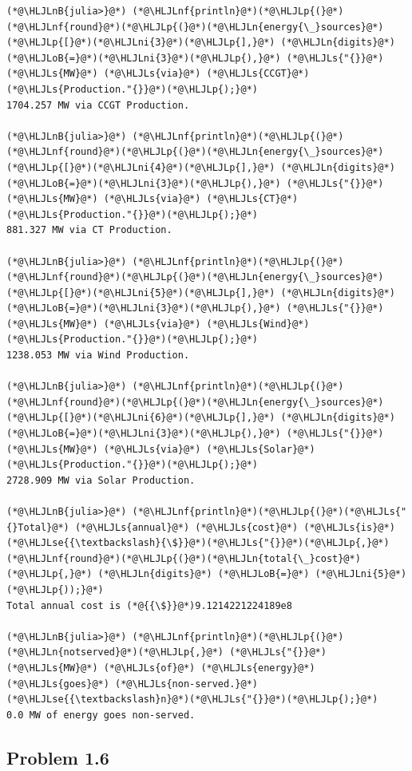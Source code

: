 \documentclass[12pt,a4paper]{article}
\newcommand{\HLJLn}[1]{#1}
\newcommand{\HLJLnf}[1]{\textcolor[RGB]{66,102,213}{#1}}
\newcommand{\HLJLs}[1]{\textcolor[RGB]{201,61,57}{#1}}
\newcommand{\HLJLse}[1]{\textcolor[RGB]{59,151,46}{#1}}
\newcommand{\HLJLnB}[1]{\textcolor[RGB]{59,151,46}{#1}}
\newcommand{\HLJLni}[1]{\textcolor[RGB]{59,151,46}{#1}}
\newcommand{\HLJLoB}[1]{\textcolor[RGB]{102,102,102}{\textbf{#1}}}
\newcommand{\HLJLp}[1]{#1}
\begin{document}
\begin{lstlisting}
(*@\HLJLnB{julia>}@*) (*@\HLJLnf{println}@*)(*@\HLJLp{(}@*)(*@\HLJLnf{round}@*)(*@\HLJLp{(}@*)(*@\HLJLn{energy{\_}sources}@*)(*@\HLJLp{[}@*)(*@\HLJLni{3}@*)(*@\HLJLp{],}@*) (*@\HLJLn{digits}@*) (*@\HLJLoB{=}@*)(*@\HLJLni{3}@*)(*@\HLJLp{),}@*) (*@\HLJLs{"{}}@*) (*@\HLJLs{MW}@*) (*@\HLJLs{via}@*) (*@\HLJLs{CCGT}@*) (*@\HLJLs{Production."{}}@*)(*@\HLJLp{);}@*)
1704.257 MW via CCGT Production.

(*@\HLJLnB{julia>}@*) (*@\HLJLnf{println}@*)(*@\HLJLp{(}@*)(*@\HLJLnf{round}@*)(*@\HLJLp{(}@*)(*@\HLJLn{energy{\_}sources}@*)(*@\HLJLp{[}@*)(*@\HLJLni{4}@*)(*@\HLJLp{],}@*) (*@\HLJLn{digits}@*) (*@\HLJLoB{=}@*)(*@\HLJLni{3}@*)(*@\HLJLp{),}@*) (*@\HLJLs{"{}}@*) (*@\HLJLs{MW}@*) (*@\HLJLs{via}@*) (*@\HLJLs{CT}@*) (*@\HLJLs{Production."{}}@*)(*@\HLJLp{);}@*)
881.327 MW via CT Production.

(*@\HLJLnB{julia>}@*) (*@\HLJLnf{println}@*)(*@\HLJLp{(}@*)(*@\HLJLnf{round}@*)(*@\HLJLp{(}@*)(*@\HLJLn{energy{\_}sources}@*)(*@\HLJLp{[}@*)(*@\HLJLni{5}@*)(*@\HLJLp{],}@*) (*@\HLJLn{digits}@*) (*@\HLJLoB{=}@*)(*@\HLJLni{3}@*)(*@\HLJLp{),}@*) (*@\HLJLs{"{}}@*) (*@\HLJLs{MW}@*) (*@\HLJLs{via}@*) (*@\HLJLs{Wind}@*) (*@\HLJLs{Production."{}}@*)(*@\HLJLp{);}@*)
1238.053 MW via Wind Production.

(*@\HLJLnB{julia>}@*) (*@\HLJLnf{println}@*)(*@\HLJLp{(}@*)(*@\HLJLnf{round}@*)(*@\HLJLp{(}@*)(*@\HLJLn{energy{\_}sources}@*)(*@\HLJLp{[}@*)(*@\HLJLni{6}@*)(*@\HLJLp{],}@*) (*@\HLJLn{digits}@*) (*@\HLJLoB{=}@*)(*@\HLJLni{3}@*)(*@\HLJLp{),}@*) (*@\HLJLs{"{}}@*) (*@\HLJLs{MW}@*) (*@\HLJLs{via}@*) (*@\HLJLs{Solar}@*) (*@\HLJLs{Production."{}}@*)(*@\HLJLp{);}@*)
2728.909 MW via Solar Production.

(*@\HLJLnB{julia>}@*) (*@\HLJLnf{println}@*)(*@\HLJLp{(}@*)(*@\HLJLs{"{}Total}@*) (*@\HLJLs{annual}@*) (*@\HLJLs{cost}@*) (*@\HLJLs{is}@*) (*@\HLJLse{{\textbackslash}{\$}}@*)(*@\HLJLs{"{}}@*)(*@\HLJLp{,}@*) (*@\HLJLnf{round}@*)(*@\HLJLp{(}@*)(*@\HLJLn{total{\_}cost}@*)(*@\HLJLp{,}@*) (*@\HLJLn{digits}@*) (*@\HLJLoB{=}@*) (*@\HLJLni{5}@*)(*@\HLJLp{));}@*)
Total annual cost is (*@{{\$}}@*)9.1214221224189e8

(*@\HLJLnB{julia>}@*) (*@\HLJLnf{println}@*)(*@\HLJLp{(}@*)(*@\HLJLn{notserved}@*)(*@\HLJLp{,}@*) (*@\HLJLs{"{}}@*) (*@\HLJLs{MW}@*) (*@\HLJLs{of}@*) (*@\HLJLs{energy}@*) (*@\HLJLs{goes}@*) (*@\HLJLs{non-served.}@*)(*@\HLJLse{{\textbackslash}n}@*)(*@\HLJLs{"{}}@*)(*@\HLJLp{);}@*)
0.0 MW of energy goes non-served.
\end{lstlisting}

\subsection{Problem 1.6}
\end{document}
